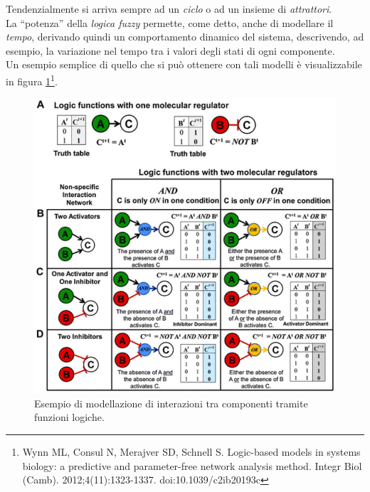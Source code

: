 \documentclass[a4paper,12pt, oneside]{book}
\begin{document}
Tendenzialmente si arriva sempre ad un \textit{ciclo} o ad un insieme di
\textit{attrattori}.\\
La ``potenza'' della \textit{logica fuzzy} permette, come detto, anche di
modellare il \textit{tempo}, derivando quindi un comportamento dinamico del
sistema, descrivendo, ad esempio, la variazione nel tempo tra i valori degli
stati di ogni componente.\\
Un esempio semplice di quello che si può ottenere con tali modelli è
visualizzabile in figura \ref{fig:log}\footnote{Wynn ML, Consul N, Merajver SD,
  Schnell S. Logic-based models in systems biology: a predictive and
  parameter-free network analysis method. Integr Biol
  (Camb). 2012;4(11):1323-1337. doi:10.1039/c2ib20193c}. 
\begin{figure}
  \centering
  \includegraphics[scale = 0.65]{img/logicnet.jpg}
  \caption{Esempio di modellazione di interazioni tra componenti tramite
    funzioni logiche.}
  \label{fig:log}
\end{figure}
\end{document}
